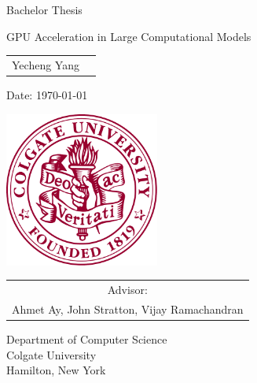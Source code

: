 \documentclass[../thesis.tex]{subfiles}
\begin{document}
\pagestyle{empty}
\renewcommand{\thepage}{\roman{page}}

\begin{titlepage}
	\begin{center}\large

		\vfill
		\vfill
		\vfill
		\vfill

		Bachelor Thesis
		\vspace*{1.5cm}

		{\bfseries{\Large{GPU Acceleration in Large Computational Models\par}}}

		\vspace*{1.5cm}

		\begin{tabular}{rl}
			Yecheng Yang\\
		\end{tabular}

		\vspace*{8mm}

		Date: \today 

		\vspace*{6mm}

        \includegraphics[width=2in]{seal_maroon.pdf}

		\vspace*{6mm}
		\begin{tabular}{c}
			Advisor:   \\
			Ahmet Ay, John Stratton, Vijay Ramachandran
			
			
		\end{tabular}

		\vspace*{10mm}


		\vspace*{10mm}
		Department of Computer Science \\
		Colgate University \\
		Hamilton, New York

		\vspace*{12mm}
		\vfill
	\end{center}

\end{titlepage}
\end{document}
